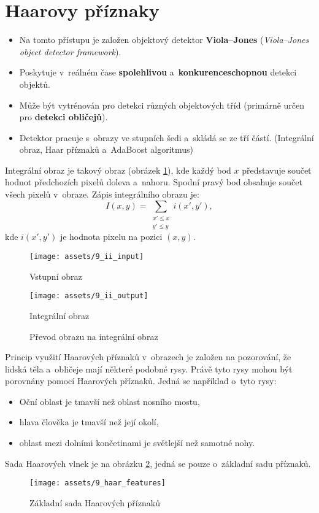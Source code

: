 \section{Haarovy příznaky}
\begin{itemize}
    \item Na tomto přístupu je založen objektový detektor \textbf{Viola--Jones} (\textit{Viola--Jones object detector framework}).
    \item Poskytuje v~reálném čase \textbf{spolehlivou} a~\textbf{konkurenceschopnou} detekci objektů.
    \item Může být vytrénován pro detekci různých objektových tříd (primárně určen pro \textbf{detekci obličejů}).
    \item Detektor pracuje s~obrazy ve stupních šedi a~skládá se ze tří částí. (Integrální obraz, Haar příznaků a~AdaBoost algoritmus)
\end{itemize}
Integrální obraz je takový obraz (obrázek \ref{fig:integralimage}), kde každý bod $x$ představuje součet hodnot předchozích pixelů doleva a~nahoru. Spodní pravý bod obsahuje součet všech pixelů v~obraze.
Zápis integrálního obrazu je:
\begin{equation*}
    \label{integralimage}
    I(x, y) = \sum_{\substack{x' \leq x \\ y' \leq y}}{} i(x', y'),
\end{equation*}
kde $i(x', y')$ je hodnota pixelu na pozici $(x, y)$.
\begin{figure}[H]
    \centering
    \begin{minipage}{.4\textwidth}
        \centering
        \texttt{[image: assets/9\_ii\_input]}
        \caption{Vstupní obraz}
        \label{fig:ii_input}
    \end{minipage}%
    \begin{minipage}{.4\textwidth}
        \centering
        \texttt{[image: assets/9\_ii\_output]}
        \caption{Integrální obraz}
        \label{fig:ii_output}
    \end{minipage}
    \caption{Převod obrazu na integrální obraz}
    \label{fig:integralimage}
\end{figure}

Princip využití Haarových příznaků v~obrazech je založen na pozorování, že lidská těla a~obličeje mají některé podobné rysy. Právě tyto rysy mohou být porovnány pomocí Haarových příznaků. Jedná se například o~tyto rysy:
\begin{itemize}
    \item{Oční oblast je tmavší než oblast nosního mostu,}
    \item{hlava člověka je tmavší než její okolí,}
    \item{oblast mezi dolními končetinami je světlejší než samotné nohy.}
\end{itemize}
Sada Haarových vlnek je na obrázku \ref{fig:basichaarfeatures}, jedná se pouze o~základní sadu příznaků.
\begin{figure}[H]
    \centering
    \texttt{[image: assets/9\_haar\_features]}
    \caption{Základní sada Haarových příznaků}
    \label{fig:basichaarfeatures}
\end{figure}

